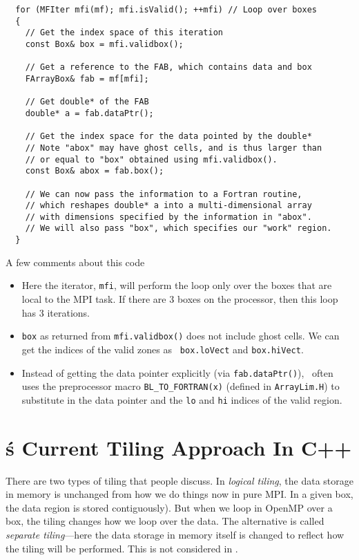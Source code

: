 \begin{lstlisting}
  for (MFIter mfi(mf); mfi.isValid(); ++mfi) // Loop over boxes
  {
    // Get the index space of this iteration
    const Box& box = mfi.validbox(); 

    // Get a reference to the FAB, which contains data and box  
    FArrayBox& fab = mf[mfi];  

    // Get double* of the FAB 
    double* a = fab.dataPtr();

    // Get the index space for the data pointed by the double* 
    // Note "abox" may have ghost cells, and is thus larger than 
    // or equal to "box" obtained using mfi.validbox().
    const Box& abox = fab.box();

    // We can now pass the information to a Fortran routine,
    // which reshapes double* a into a multi-dimensional array 
    // with dimensions specified by the information in "abox".
    // We will also pass "box", which specifies our "work" region.
  }
\end{lstlisting}
A few comments about this code
\begin{itemize}
\item Here the iterator, {\tt mfi}, will perform the loop only over the
   boxes that are local to the MPI task.  If there are 3 boxes on the
   processor, then this loop has 3 iterations.
      
\item {\tt box} as returned from {\tt mfi.validbox()} does not include
   ghost cells.  We can get the indices of the valid zones as {\tt
   box.loVect} and {\tt box.hiVect}.

\item Instead of getting the data pointer explicitly (via {\tt fab.dataPtr()}),
   \castro\ often uses the preprocessor macro {\tt BL\_TO\_FORTRAN(x)} (defined
   in {\tt ArrayLim.H}) to substitute in the data pointer and the {\tt lo}
   and {\tt hi} indices of the valid region.
\end{itemize}


\section{\boxlib\'s Current Tiling Approach In C++}
\label{sec:boxlib1}

There are two types of tiling that people discuss.  In {\em logical
tiling}, the data storage in memory is unchanged from how we do things
now in pure MPI.  In a given box, the data region is stored
contiguously).  But when we loop in OpenMP over a box, the tiling
changes how we loop over the data.  The alternative is called {\em
separate tiling}---here the data storage in memory itself is changed
to reflect how the tiling will be performed.  This is not considered
in \boxlib.

